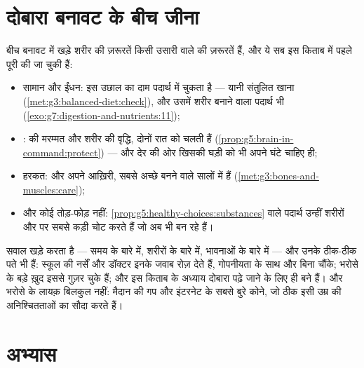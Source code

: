 \section{दोबारा बनावट के बीच जीना}

\begin{proposition}[उसारी के दौरान देखभाल]\label{prop:g8:puberty:care}
बीच बनावट में खड़े शरीर की ज़रूरतें किसी उसारी वाले की ज़रूरतें हैं, और
ये सब इस किताब में पहले पूरी की जा चुकी हैं:
\begin{itemize}
  \item सामान और ईंधन: इस उछाल का दाम पदार्थ में चुकता है --- यानी
        संतुलित खाना (\cref{met:g3:balanced-diet:check}), और उसमें
        शरीर बनाने वाला पदार्थ भी
        (\cref{exo:g7:digestion-and-nutrients:11});
  \item {}:  की मरम्मत और शरीर की वृद्धि, दोनों रात को चलती
        हैं (\cref{prop:g5:brain-in-command:protect}) --- और देर की
        ओर खिसकी घड़ी को भी अपने घंटे चाहिए ही;
  \item हरकत:  और  अपने आख़िरी, सबसे अच्छे बनने वाले सालों
        में हैं (\cref{met:g3:bones-and-muscles:care});
  \item और कोई तोड़-फोड़ नहीं:
        \cref{prop:g5:healthy-choices:substances} वाले पदार्थ उन्हीं
        शरीरों और  पर सबसे कड़ी चोट करते हैं जो अब भी बन रहे
        हैं।
\end{itemize}
\end{proposition}
\admitted

\begin{example}[सवालों के पते होते हैं]\label{ex:g8:puberty:questions}
 सवाल खड़े करता है --- समय के बारे में, शरीरों के बारे में,
भावनाओं के बारे में --- और उनके ठीक-ठीक पते भी हैं: स्कूल की नर्सें और
डॉक्टर इनके जवाब रोज़ देते हैं, गोपनीयता के साथ और बिना चौंके; भरोसे के
बड़े ख़ुद इससे गुज़र चुके हैं; और इस किताब के अध्याय दोबारा पढ़े जाने के
लिए ही बने हैं। और भरोसे के लायक़ बिलकुल नहीं: मैदान की गप और इंटरनेट के
सबसे बुरे कोने, जो ठीक इसी उम्र की अनिश्चितताओं का सौदा करते हैं।
\end{example}

\section{अभ्यास}

